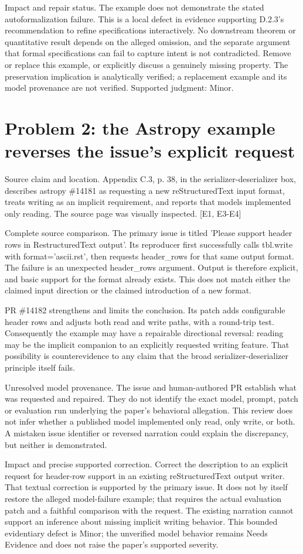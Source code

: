 \documentclass[10pt]{article}
\begin{document}
Impact and repair status. The example does not demonstrate the stated autoformalization failure. This is a local defect in evidence supporting D.2.3’s recommendation to refine specifications interactively. No downstream theorem or quantitative result depends on the alleged omission, and the separate argument that formal specifications can fail to capture intent is not contradicted. Remove or replace this example, or explicitly discuss a genuinely missing property. The preservation implication is analytically verified; a replacement example and its model provenance are not verified. Supported judgment: Minor.\par
\section*{Problem 2: the Astropy example reverses the issue’s explicit request}
Source claim and location. Appendix C.3, p. 38, in the serializer-deserializer box, describes astropy \#14181 as requesting a new reStructuredText input format, treats writing as an implicit requirement, and reports that models implemented only reading. The source page was visually inspected. [E1, E3-E4]\par
Complete source comparison. The primary issue is titled ’Please support header rows in RestructuredText output’. Its reproducer first successfully calls tbl.write with format=’ascii.rst’, then requests header\_rows for that same output format. The failure is an unexpected header\_rows argument. Output is therefore explicit, and basic support for the format already exists. This does not match either the claimed input direction or the claimed introduction of a new format.\par
PR \#14182 strengthens and limits the conclusion. Its patch adds configurable header rows and adjusts both read and write paths, with a round-trip test. Consequently the example may have a repairable directional reversal: reading may be the implicit companion to an explicitly requested writing feature. That possibility is counterevidence to any claim that the broad serializer-deserializer principle itself fails.\par
Unresolved model provenance. The issue and human-authored PR establish what was requested and repaired. They do not identify the exact model, prompt, patch or evaluation run underlying the paper’s behavioral allegation. This review does not infer whether a published model implemented only read, only write, or both. A mistaken issue identifier or reversed narration could explain the discrepancy, but neither is demonstrated.\par
Impact and precise supported correction. Correct the description to an explicit request for header-row support in an existing reStructuredText output writer. That textual correction is supported by the primary issue. It does not by itself restore the alleged model-failure example; that requires the actual evaluation patch and a faithful comparison with the request. The existing narration cannot support an inference about missing implicit writing behavior. This bounded evidentiary defect is Minor; the unverified model behavior remains Needs Evidence and does not raise the paper’s supported severity.\par
\end{document}
